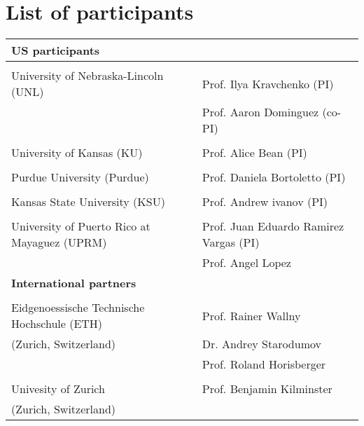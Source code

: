 \section{List of participants}

\begin{tabular}{|ll|}
\hline
{\bf US participants} & \\
\hline
 & \\
University of Nebraska-Lincoln (UNL) 
   & Prof. Ilya Kravchenko (PI)     \\
   & Prof. Aaron Dominguez (co-PI)  \\
&\\
University of Kansas (KU)
   & Prof. Alice Bean (PI) \\
&\\
Purdue University (Purdue)
   & Prof. Daniela Bortoletto (PI) \\
&\\
Kansas State University (KSU)
   & Prof. Andrew ivanov (PI) \\
&\\
University of Puerto Rico at Mayaguez (UPRM)
   & Prof. Juan Eduardo Ramirez Vargas (PI) \\
   & Prof. Angel Lopez \\
\hline
{\bf International partners} &\\
\hline
&\\
Eidgenoessische Technische Hochschule (ETH)  & Prof. Rainer Wallny \\
  (Zurich, Switzerland)                      & Dr. Andrey Starodumov \\
                                             & Prof. Roland Horisberger \\
& \\
Univesity of Zurich                          & Prof. Benjamin Kilminster \\
  (Zurich, Switzerland)   & \\
\hline
\end{tabular}

